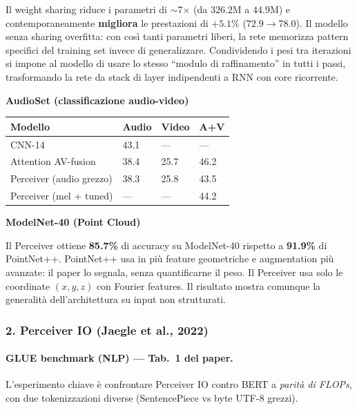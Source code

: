 \documentclass[
  11pt,
]{article}
\begin{document}
\begin{notabox}[title={\textbf{Weight sharing come regolarizzatore}}]
Il weight sharing riduce i parametri di $\sim$7$\times$ (da $326.2$M a $44.9$M) e contemporaneamente \textbf{migliora} le prestazioni di $+5.1\%$ ($72.9 \to 78.0$). Il modello senza sharing overfitta: con così tanti parametri liberi, la rete memorizza pattern specifici del training set invece di generalizzare. Condividendo i pesi tra iterazioni si impone al modello di usare lo stesso ``modulo di raffinamento'' in tutti i passi, trasformando la rete da stack di layer indipendenti a RNN con core ricorrente.
\end{notabox}

\textbf{AudioSet (classificazione audio-video)}

{\small
\begin{longtable}{@{}p{4.5cm} p{2.2cm} p{2.2cm} p{2.2cm}@{}}
\toprule
\textbf{Modello} & \textbf{Audio} & \textbf{Video} & \textbf{A+V} \\
\midrule
\endhead
CNN-14 & 43.1 & --- & --- \\[2pt]
Attention AV-fusion & 38.4 & 25.7 & 46.2 \\[2pt]
Perceiver (audio grezzo) & 38.3 & 25.8 & 43.5 \\[2pt]
Perceiver (mel + tuned) & --- & --- & 44.2 \\
\bottomrule
\end{longtable}
}

\textbf{ModelNet-40 (Point Cloud)}

Il Perceiver ottiene \textbf{85.7\%} di accuracy su ModelNet-40 rispetto a \textbf{91.9\%} di PointNet++. PointNet++ usa in più feature geometriche e augmentation più avanzate: il paper lo segnala, senza quantificarne il peso. Il Perceiver usa solo le coordinate $(x,y,z)$ con Fourier features. Il risultato mostra comunque la generalità dell'architettura su input non strutturati.

\subsubsection*{2. Perceiver IO (Jaegle et al., 2022)}

\paragraph{GLUE benchmark (NLP) --- Tab.\ 1 del paper.} L'esperimento chiave è confrontare Perceiver IO contro BERT a \emph{parità di FLOPs}, con due tokenizzazioni diverse (SentencePiece vs byte UTF-8 grezzi).
\end{document}

